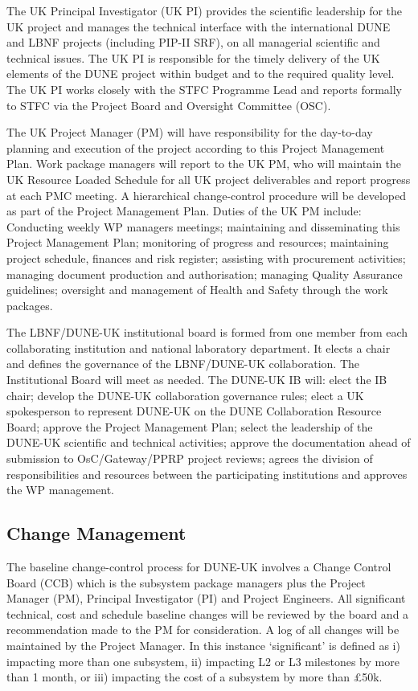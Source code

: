 The UK Principal Investigator (UK PI) provides the scientific leadership for the UK project and manages the technical interface with the international DUNE and LBNF projects (including PIP-II SRF), on all managerial scientific and technical issues. The UK PI is responsible for the timely delivery of the UK elements of the DUNE project within budget and to the required quality level.  The UK PI works closely with the STFC Programme Lead and reports formally to STFC via the Project Board and Oversight Committee (OSC). 

The UK Project Manager (PM) will have responsibility for the day-to-day planning and execution of the project according to this Project Management Plan. Work package managers will report to the UK PM, who will maintain the UK Resource Loaded Schedule for all UK project deliverables and report progress at each PMC meeting.  A hierarchical change-control procedure will be developed as part of the Project Management Plan.  Duties of the UK PM include: Conducting weekly WP managers meetings; maintaining and disseminating this Project Management Plan; monitoring of progress and resources; maintaining project schedule, finances and risk register; assisting with procurement activities; managing document production and authorisation; managing Quality Assurance guidelines; oversight and management of Health and Safety through the work packages.

The LBNF/DUNE-UK institutional board\cite{IB} is formed from one member from each collaborating institution and national laboratory department. It elects a chair and defines the governance of the LBNF/DUNE-UK collaboration. The Institutional Board will meet as needed. The DUNE-UK IB will: elect the IB chair; develop the DUNE-UK collaboration governance rules; elect a UK spokesperson to represent DUNE-UK on the DUNE Collaboration Resource Board; approve the Project  Management Plan; select the leadership of the DUNE-UK scientific and technical activities; approve the documentation ahead of submission to OsC/Gateway/PPRP project reviews; agrees the division of responsibilities and resources between the participating institutions and approves the WP management.

\subsection{Change Management}
The baseline change-control process for DUNE-UK involves a Change Control Board (CCB) which is the subsystem package managers plus the Project Manager (PM), Principal Investigator (PI) and Project Engineers. All significant technical, cost and schedule baseline changes will be reviewed by the board and a recommendation made to the PM for consideration. A log of all changes will be maintained by the Project Manager. In this instance ‘significant’ is defined as i) impacting more than one subsystem, ii) impacting L2 or L3 milestones by more than 1 month, or iii) impacting the cost of a subsystem by more than £50k.

